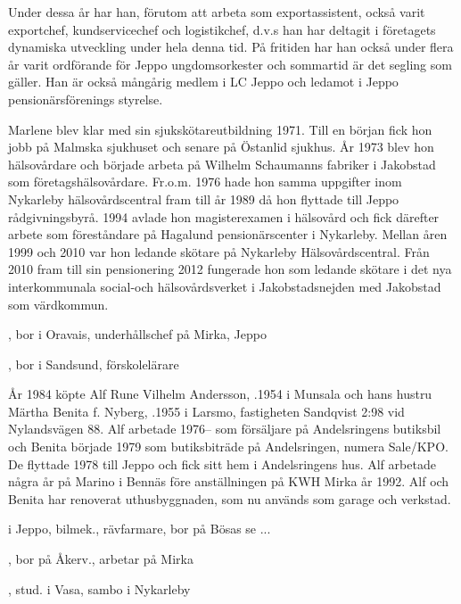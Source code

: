 Under dessa år har han, förutom att arbeta som exportassistent, också varit exportchef, kundservicechef och logistikchef, d.v.s han har deltagit i företagets dynamiska utveckling under hela denna tid. På fritiden har han också under flera år varit ordförande för Jeppo ungdomsorkester och sommartid är det segling som gäller. Han är också mångårig medlem i LC Jeppo och ledamot i Jeppo pensionärsförenings styrelse.

Marlene blev klar med sin sjukskötareutbildning 1971. Till en början fick hon jobb på Malmska sjukhuset och senare på Östanlid sjukhus. År 1973 blev hon hälsovårdare och började arbeta på Wilhelm Schaumanns fabriker i Jakobstad som företagshälsovårdare. Fr.o.m. 1976 hade hon samma uppgifter inom Nykarleby hälsovårdscentral fram till år 1989 då hon flyttade till Jeppo rådgivningsbyrå. 1994 avlade hon magisterexamen i hälsovård och fick därefter arbete som föreståndare på Hagalund pensionärscenter i Nykarleby. Mellan åren 1999 och 2010 var hon ledande skötare på Nykarleby Hälsovårdscentral. Från 2010 fram till sin pensionering 2012 fungerade hon som ledande skötare i det nya interkommunala social-och hälsovårdsverket i Jakobstadsnejden med Jakobstad som värdkommun.
\begin{jhchildren}
  \item {}, bor i Oravais, underhållschef på Mirka, Jeppo
  \item {}, bor i Sandsund, förskolelärare
\end{jhchildren}






År 1984 köpte Alf Rune Vilhelm Andersson, .1954 i Munsala och hans hustru Märtha Benita f. Nyberg, .1955 i Larsmo, fastigheten Sandqvist 2:98 vid Nylandsvägen 88. Alf arbetade 1976-- som försäljare på Andelsringens butiksbil och Benita började 1979 som butiksbiträde på Andelsringen, numera Sale/KPO. De flyttade 1978 till Jeppo och fick sitt hem i Andelsringens hus. Alf arbetade några år på Marino i Bennäs före anställningen på KWH Mirka år 1992. Alf och Benita har renoverat uthusbyggnaden, som nu används som garage och verkstad.
\begin{jhchildren}
  \item {} i Jeppo, bilmek., rävfarmare, bor på Bösas se ...
  \item {}, bor på Åkerv., arbetar på Mirka
  \item {}, stud. i Vasa, sambo i Nykarleby
\end{jhchildren}


